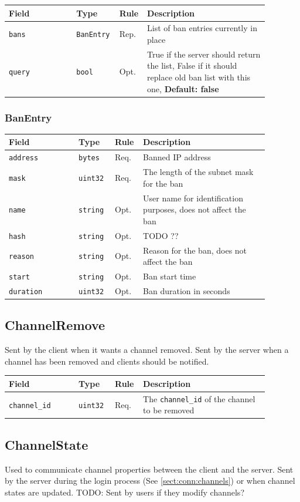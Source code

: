 \documentclass[11pt]{article} %
\newenvironment{mumbleMessageEx}
{%
	\small
	\renewcommand\arraystretch{1.5}
	\begin{tabular}{p{0.25\linewidth}p{0.13\linewidth}p{0.05\linewidth}p{0.45\linewidth}}
	Field & Type & Rule & Description \\
	\hline
}
{%
	\end{tabular}
	\renewcommand\arraystretch{1.0}
}
\newcommand{\mumbleMessageExItem}[4]{ \texttt{#1} & \texttt{#2} & #3 & #4 \\ }
\begin{document}
\begin{mumbleMessageEx}
\mumbleMessageExItem{bans}{BanEntry}{Rep.}{List of ban entries currently in place}
\mumbleMessageExItem{query}{bool}{Opt.}{True if the server should return the list, False if it should replace old ban list with this one, \textbf{Default: false}}
\end{mumbleMessageEx}

\subsubsection{BanEntry}
\label{msg:banEntry}

\begin{mumbleMessageEx}
\mumbleMessageExItem{address}{bytes}{Req.}{Banned IP address}
\mumbleMessageExItem{mask}{uint32}{Req.}{The length of the subnet mask for the ban}
\mumbleMessageExItem{name}{string}{Opt.}{User name for identification purposes, does not affect the ban}
\mumbleMessageExItem{hash}{string}{Opt.}{TODO ??}
\mumbleMessageExItem{reason}{string}{Opt.}{Reason for the ban, does not affect the ban}
\mumbleMessageExItem{start}{string}{Opt.}{Ban start time}
\mumbleMessageExItem{duration}{uint32}{Opt.}{Ban duration in seconds}
\end{mumbleMessageEx}

\subsection{ChannelRemove}
\label{msg:channelRemove}

Sent by the client when it wants a channel removed. Sent by the server when a channel has been removed and clients should be notified.

\begin{mumbleMessageEx}
\mumbleMessageExItem{channel\_id}{uint32}{Req.}{The \texttt{channel\_id} of the channel to be removed}
\end{mumbleMessageEx}

\subsection{ChannelState}
\label{msg:channelState}

Used to communicate channel properties between the client and the server. Sent by the server during the login process (See \ref{sect:conn:channels}) or when channel states are updated. TODO: Sent by users if they modify channels?
\end{document}
